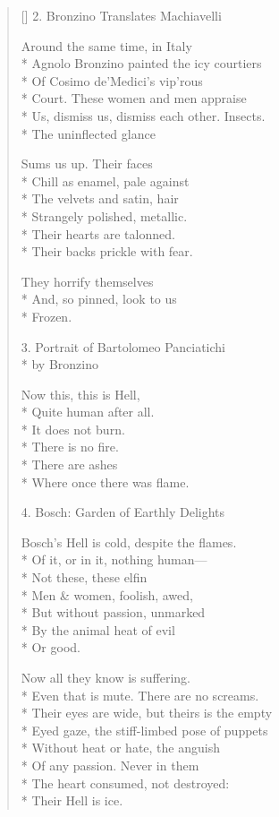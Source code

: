\begin{verse}[\versewidth]
2. Bronzino Translates Machiavelli

Around the same time, in Italy\\*
Agnolo Bronzino painted the icy courtiers\\*
Of Cosimo de'Medici's vip'rous\\*
Court.  These women and men appraise\\*
Us, dismiss us, dismiss each other.  Insects.\\*
The uninflected glance

Sums us up.   Their faces\\*
Chill as enamel, pale against\\*
The velvets and satin, hair\\*
Strangely polished, metallic.\\*
Their hearts are talonned.\\*
Their backs prickle with fear.

They horrify themselves\\*
And, so pinned, look to us\\*
Frozen.

3. Portrait of Bartolomeo Panciatichi\\*
                by Bronzino

Now this, this is Hell,\\*
Quite human after all.\\*
It does not burn.\\*
There is no fire.\\*
There are ashes\\*
Where once there was flame.

4. Bosch: Garden of Earthly Delights

Bosch's Hell is cold, despite the flames.\\*
Of it, or in it, nothing human---\\*
Not these, these elfin\\*
Men \& women, foolish, awed,\\*
But without passion, unmarked\\*
By the animal heat of evil\\*
Or good.

Now all they know is suffering.\\*
Even that is mute. There are no screams.\\*
Their eyes are wide, but theirs is the empty\\*
Eyed gaze, the stiff-limbed pose of puppets\\*
Without heat or hate, the anguish\\*
Of any passion. Never in them\\*
The heart consumed, not destroyed:\\*
Their Hell is ice.


\end{verse}
